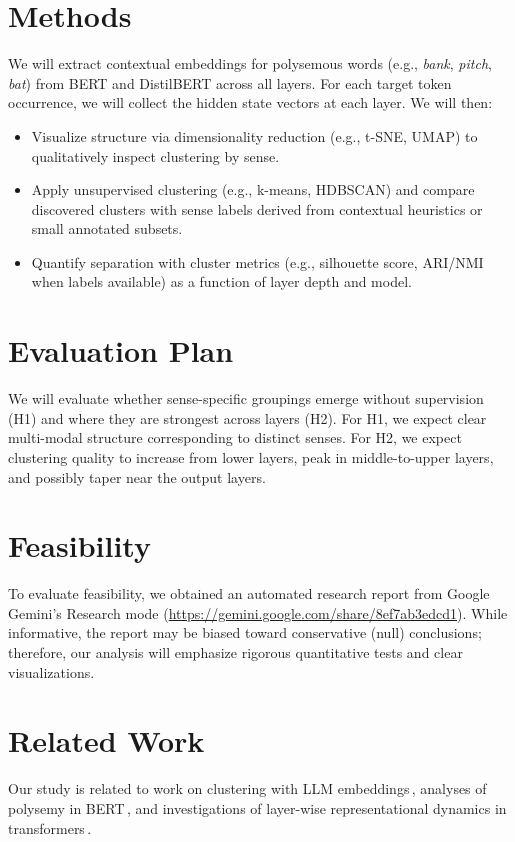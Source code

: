 \documentclass{template}
\begin{document}
\newpage


\section*{Methods}
We will extract contextual embeddings for polysemous words (e.g., \textit{bank}, \textit{pitch}, \textit{bat}) from BERT and DistilBERT across all layers. For each target token occurrence, we will collect the hidden state vectors at each layer. We will then:
\begin{itemize}
    \item Visualize structure via dimensionality reduction (e.g., t\textsc{-}SNE, UMAP) to qualitatively inspect clustering by sense.
    \item Apply unsupervised clustering (e.g., k-means, HDBSCAN) and compare discovered clusters with sense labels derived from contextual heuristics or small annotated subsets.
    \item Quantify separation with cluster metrics (e.g., silhouette score, ARI/NMI when labels available) as a function of layer depth and model.
\end{itemize}


\section*{Evaluation Plan}
We will evaluate whether sense-specific groupings emerge without supervision (H1) and where they are strongest across layers (H2). For H1, we expect clear multi-modal structure corresponding to distinct senses. For H2, we expect clustering quality to increase from lower layers, peak in middle-to-upper layers, and possibly taper near the output layers.


\section*{Feasibility}
To evaluate feasibility, we obtained an automated research report from Google Gemini's Research mode (\url{https://gemini.google.com/share/8ef7ab3edcd1}). While informative, the report may be biased toward conservative (null) conclusions; therefore, our analysis will emphasize rigorous quantitative tests and clear visualizations.

\newpage


\section*{Related Work}
Our study is related to work on clustering with LLM embeddings\,\cite{petukhova2025}, analyses of polysemy in BERT\,\cite{yenicelik2020}, and investigations of layer-wise representational dynamics in transformers\,\cite{nadipalli2025}.

\vspace{0.2in}

\makecitations%
\vfill
\pagebreak
\end{document}
